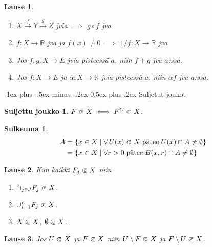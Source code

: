 \documentclass[landscape,a4paper,10pt]{article}
\makeatletter
\renewcommand{\section}{\@startsection{section}{1}{0mm}%
                                {-1ex plus -.5ex minus -.2ex}%
                                {0.5ex plus .2ex}%
                                {\color{blue}\normalfont\large\bfseries}}
\newcommand\opn{\mathrel{\ooalign{$\subset$\cr
  \hidewidth\hbox{$\circ\mkern.5mu$}\cr}}}
\newcommand\cls{\mathrel{\ooalign{$\subset$\cr
\hidewidth\raise.225ex\hbox{$\text{{\scriptsize c}}\mkern2mu$}\cr}}}
\theoremstyle{customtheoremstyle}
\newtheorem*{theorem}{Lause}
\makeatother
\begin{document}
\begin{multicols*}{3}
\begin{theorem}
  \begin{enumerate}
    \item[(1)]{$X \stackrel{f}{\rightarrow} Y \stackrel{g}{\rightarrow} Z$ jvia
      $\implies$ $g \circ f$ jva}
    \item[(2)]{$f : X \rightarrow \mathbb{R}$ jva ja $f(x) \neq 0$ $\implies$
      $1/f : X \rightarrow \mathbb{R}$ jva}
    \item[(3)]{Jos $f,g: X \rightarrow E$ jvia pisteessä $a$, niin $f+g$ jva
      $a$:ssa.}
    \item[(4)]{Jos $f: X \rightarrow E$ ja $\alpha: X \rightarrow \mathbb{R}$
      jvia pisteessä $a$, niin $\alpha f$ jva $a$:ssa.}
  \end{enumerate}
\end{theorem}

\section{Suljetut joukot}
\newtheorem*{defn:closedSet}{Suljettu joukko}
\begin{defn:closedSet}
  $F \cls X \iff F^C \opn X$.
\end{defn:closedSet}

\newtheorem*{defn:closure}{Sulkeuma}
\begin{defn:closure}
  \begin{align*}
    \bar{A} &=
    \{ x \in X \; | \; \forall \, U(x) \opn X \; \text{pätee} \; U(x) \cap A \neq \emptyset \}
    \\
    &= \{ x \in X \; | \; \forall r > 0 \; \text{pätee} \; B(x,r) \cap A \neq
    \emptyset \}
  \end{align*}
\end{defn:closure}

\begin{theorem}
  Kun kaikki $F_j \cls X$ niin
  \begin{enumerate}
    \item{$\cap_{j \in J} F_j \cls X$.}
    \item{$\cup_{i=1}^{n} F_j \cls X$.}
    \item{$X \cls X$, $\emptyset \cls X$.}
  \end{enumerate}
\end{theorem}

\begin{theorem}
  Jos $U \opn X$ ja $F \cls X$ niin $U \setminus F \opn X$ ja $F \setminus U
  \cls X$.
\end{theorem}


\end{multicols*}
\end{document}
